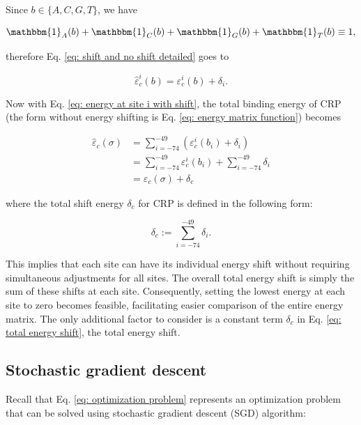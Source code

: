 \documentclass{article}
\begin{document}
Since $b\in \{A,C,G,T\}$, we have

\begin{equation}  \mathbbm{1}_A(b)+\mathbbm{1}_C(b)+\mathbbm{1}_G(b)+\mathbbm{1}_T(b)\equiv 1,
\end{equation}

\noindent therefore Eq. \ref{eq: shift and no shift detailed} goes to

\begin{equation}\label{eq: energy at site i with shift}
    \hat{\varepsilon}_c^{i} (b) = \varepsilon_c^{i} (b) + \delta_i.
\end{equation}

Now with Eq. \ref{eq: energy at site i with shift}, the total binding energy of CRP (the form without energy shifting is Eq. \ref{eq: energy matrix function}) becomes

\begin{equation}
\begin{aligned}
    \hat{\varepsilon}_c(\sigma) &= \sum_{i=-74}^{-49} (\varepsilon_c^{i}(b_i)+\delta_i) \\
    &=  \sum_{i=-74}^{-49} \varepsilon_c^{i}(b_i) + \sum_{i=-74}^{-49} \delta_i \\
    &= \varepsilon_c(\sigma) + \delta_c
\end{aligned}
\end{equation}

\noindent where the total shift energy $\delta_c$ for CRP is defined in the following form:

\begin{equation}\label{eq: total energy shift}
    \delta_c := \sum_{i=-74}^{-49} \delta_i.
\end{equation}

This implies that each site can have its individual energy shift without requiring simultaneous adjustments for all sites. The overall total energy shift is simply the sum of these shifts at each site. Consequently, setting the lowest energy at each site to zero becomes feasible, facilitating easier comparison of the entire energy matrix. The only additional factor to consider is a constant term $\delta_c$ in Eq. \ref{eq: total energy shift}, the total energy shift.


\subsection{Stochastic gradient descent}
Recall that Eq. \ref{eq: optimization problem} represents an optimization problem that can be solved using stochastic gradient descent (SGD) algorithm:
\end{document}
